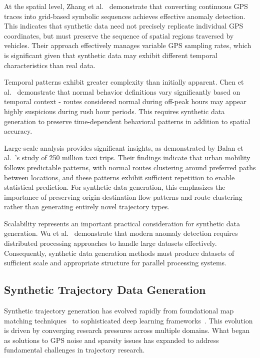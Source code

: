 \documentclass[runningheads]{llncs}
\begin{document}
At the spatial level, Zhang et al.~\cite{zhang2019ibat} demonstrate that converting continuous GPS traces into grid-based symbolic sequences achieves effective anomaly detection. This indicates that synthetic data need not precisely replicate individual GPS coordinates, but must preserve the sequence of spatial regions traversed by vehicles. Their approach effectively manages variable GPS sampling rates, which is significant given that synthetic data may exhibit different temporal characteristics than real data.

Temporal patterns exhibit greater complexity than initially apparent. Chen et al.~\cite{chen2021temporal} demonstrate that normal behavior definitions vary significantly based on temporal context - routes considered normal during off-peak hours may appear highly suspicious during rush hour periods. This requires synthetic data generation to preserve time-dependent behavioral patterns in addition to spatial accuracy.

Large-scale analysis provides significant insights, as demonstrated by Balan et al.~\cite{balan2011real}'s study of 250 million taxi trips. Their findings indicate that urban mobility follows predictable patterns, with normal routes clustering around preferred paths between locations, and these patterns exhibit sufficient repetition to enable statistical prediction. For synthetic data generation, this emphasizes the importance of preserving origin-destination flow patterns and route clustering rather than generating entirely novel trajectory types.

Scalability represents an important practical consideration for synthetic data generation. Wu et al.~\cite{wu2024safety} demonstrate that modern anomaly detection requires distributed processing approaches to handle large datasets effectively. Consequently, synthetic data generation methods must produce datasets of sufficient scale and appropriate structure for parallel processing systems.

\subsection{Synthetic Trajectory Data Generation}
\label{sec:generation-review}

Synthetic trajectory generation has evolved rapidly from foundational map matching techniques~\cite{newson2009hidden} to sophisticated deep learning frameworks~\cite{cao2021generating,wang2025gtg}. This evolution is driven by converging research pressures across multiple domains. What began as solutions to GPS noise and sparsity issues has expanded to address fundamental challenges in trajectory research.
\end{document}
